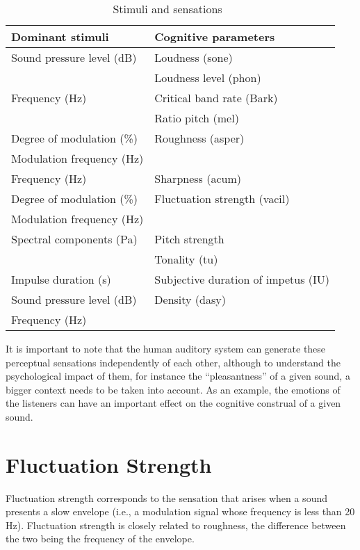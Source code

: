 \documentclass[../main.tex]{subfiles}
\begin{document}
\begin{theoreticalbackground}
\begin{table}[ht]
  \centering
  \begin{tabu} to \linewidth{ X X }
    \toprule
    \rowfont\bfseries
    Dominant stimuli & Cognitive parameters \\
    \midrule
    Sound pressure level (dB) & Loudness (sone) \\
    & Loudness level (phon) \\
    \midrule
    Frequency (Hz) & Critical band rate (Bark) \\
    & Ratio pitch (mel) \\
    \midrule
    Degree of modulation (\%) & Roughness (asper)\\
    Modulation frequency (Hz) & \\
    \midrule
    Frequency (Hz) & Sharpness (acum) \\
    \midrule
    Degree of modulation (\%) & Fluctuation strength (vacil) \\
    Modulation frequency (Hz) & \\
    \midrule
    Spectral components (Pa) & Pitch strength \\
    & Tonality (tu) \\
    \midrule
    Impulse duration (s) & Subjective duration of impetus (IU) \\
    \midrule
    Sound pressure level (dB) & Density (dasy) \\
    Frequency (Hz) & \\
    \bottomrule
  \end{tabu}
  \caption{Stimuli and sensations~\cite[pp.~70]{Mueller2012Handbook}}
\label{tab:stimsens}
\end{table}

It is important to note that the human auditory system can generate these
perceptual sensations independently of each other, although to understand the
psychological impact of them, for instance the ``pleasantness'' of a given
sound, a bigger context needs to be taken into account. As an example, the
emotions of the listeners can have an important effect on the cognitive
construal of a given sound.

\section{Fluctuation Strength}

Fluctuation strength corresponds to the sensation that arises when a sound
presents a slow envelope (i.e., a modulation signal whose frequency is less than
20 Hz). Fluctuation strength is closely related to roughness, the difference
between the two being the frequency of the envelope.


\end{theoreticalbackground}
\end{document}
